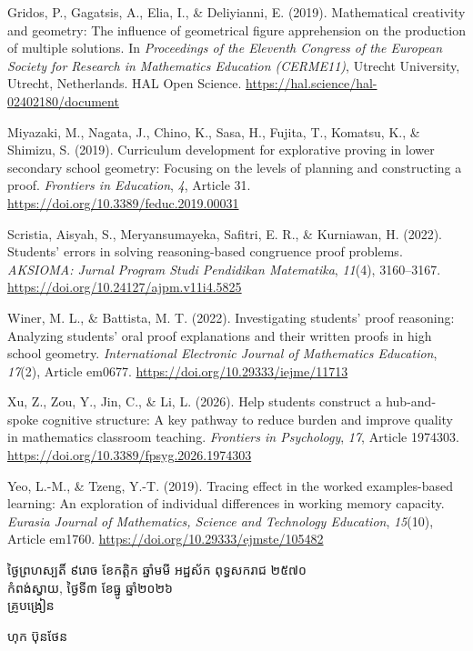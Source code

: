 \documentclass[a4paper,12pt]{article}
\begin{document}
{Gridos, P., Gagatsis, A., Elia, I., \& Deliyianni, E. (2019). Mathematical creativity and geometry: The influence of geometrical figure apprehension on the production of multiple solutions. In \textit{Proceedings of the Eleventh Congress of the European Society for Research in Mathematics Education (CERME11)}, Utrecht University, Utrecht, Netherlands. HAL Open Science. \url{https://hal.science/hal-02402180/document}

Miyazaki, M., Nagata, J., Chino, K., Sasa, H., Fujita, T., Komatsu, K., \& Shimizu, S. (2019). Curriculum development for explorative proving in lower secondary school geometry: Focusing on the levels of planning and constructing a proof. \textit{Frontiers in Education}, \textit{4}, Article 31. \url{https://doi.org/10.3389/feduc.2019.00031}

Scristia, Aisyah, S., Meryansumayeka, Safitri, E. R., \& Kurniawan, H. (2022). Students' errors in solving reasoning-based congruence proof problems. \textit{AKSIOMA: Jurnal Program Studi Pendidikan Matematika}, \textit{11}(4), 3160--3167. \url{https://doi.org/10.24127/ajpm.v11i4.5825}

Winer, M. L., \& Battista, M. T. (2022). Investigating students' proof reasoning: Analyzing students' oral proof explanations and their written proofs in high school geometry. \textit{International Electronic Journal of Mathematics Education}, \textit{17}(2), Article em0677. \url{https://doi.org/10.29333/iejme/11713}

Xu, Z., Zou, Y., Jin, C., \& Li, L. (2026). Help students construct a hub-and-spoke cognitive structure: A key pathway to reduce burden and improve quality in mathematics classroom teaching. \textit{Frontiers in Psychology}, \textit{17}, Article 1974303. \url{https://doi.org/10.3389/fpsyg.2026.1974303}

Yeo, L.-M., \& Tzeng, Y.-T. (2019). Tracing effect in the worked examples-based learning: An exploration of individual differences in working memory capacity. \textit{Eurasia Journal of Mathematics, Science and Technology Education}, \textit{15}(10), Article em1760. \url{https://doi.org/10.29333/ejmste/105482}
\par}

\vspace{8pt}
\Needspace{2.0cm}
\hfill
\begin{minipage}{9.8cm}
  {\centering
    ថ្ងៃព្រហស្បតិ៍ ៩រោច ខែកត្តិក ឆ្នាំមមី អដ្ឋស័ក ពុទ្ធសករាជ ២៥៧០\\[2pt]
    កំពង់ស្វាយ, ថ្ងៃទី៣ ខែធ្នូ ឆ្នាំ២០២៦\\[3pt]
    {\muol គ្រូបង្រៀន}\par}
  \vspace{24pt}
  \hfill{\muol ហុក ប៊ុនថែន}\hspace*{1.4cm}
\end{minipage}
\end{document}
